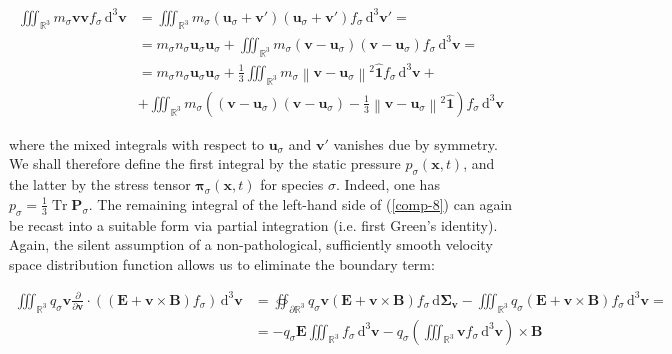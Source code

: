 \begin{align*}
    \iiint_{\mathbb{R}^3}m_\sigma \mathbf{v}\mathbf{v}f_\sigma\,\mathrm{d}^3 \mathbf{v}&=\iiint_{\mathbb{R}^3}m_\sigma \left(\mathbf{u}_\sigma+\mathbf{v}'\right)\left(\mathbf{u}_\sigma+\mathbf{v}'\right)f_\sigma\,\mathrm{d}^3 \mathbf{v}'=\\
    &=m_\sigma n_\sigma \mathbf{u}_\sigma \mathbf{u}_\sigma+\iiint_{\mathbb{R}^3}m_\sigma \left(\mathbf{v}-\mathbf{u}_\sigma\right)\left(\mathbf{v}-\mathbf{u}_\sigma\right) f_\sigma\,\mathrm{d}^3 \mathbf{v}=\\
    &=m_\sigma n_\sigma \mathbf{u}_\sigma \mathbf{u}_\sigma+\frac{1}{3}\iiint_{\mathbb{R}^3}m_\sigma \left\|\mathbf{v}-\mathbf{u}_\sigma\right\|^2 \mathbf{\hat{1}} f_\sigma\,\mathrm{d}^3 \mathbf{v}+\\
    &+\iiint_{\mathbb{R}^3}m_\sigma \left(\left(\mathbf{v}-\mathbf{u}_\sigma\right)\left(\mathbf{v}-\mathbf{u}_\sigma\right)-\frac{1}{3}\left\|\mathbf{v}-\mathbf{u}_\sigma\right\|^2 \mathbf{\hat{1}}\right)f_\sigma\,\mathrm{d}^3 \mathbf{v}
\end{align*}

where the mixed integrals with respect to $\mathbf{u}_\sigma$ and $\mathbf{v}'$ vanishes due by symmetry. We shall therefore define the first integral by the static pressure $p_\sigma(\mathbf{x},t)$, and the latter by the stress tensor $\boldsymbol{\pi}_\sigma(\mathbf{x},t)$ for species $\sigma$. Indeed, one has $p_\sigma = \frac{1}{3}\operatorname{Tr}{\mathbf{P}_\sigma}$. The remaining integral of the left-hand side of (\ref{comp-8}) can again be recast into a suitable form via partial integration (i.e. first Green's identity). Again, the silent assumption of a non-pathological, sufficiently smooth velocity space distribution function allows us to eliminate the boundary term:

\begin{align*}
    \iiint_{\mathbb{R}^3}q_\sigma\mathbf{v}\frac{\partial}{\partial \mathbf{v}}\cdot \left(\left(\mathbf{E}+\mathbf{v}\times \mathbf{B}\right) f_\sigma\right)\,\mathrm{d}^3 \mathbf{v}&=\oiint_{\partial\mathbb{R}^3}q_\sigma \mathbf{v}\left(\mathbf{E}+\mathbf{v}\times \mathbf{B}\right)f_\sigma\,\mathrm{d}\boldsymbol{\Sigma}_{\mathbf{v}}-\iiint_{\mathbb{R}^3}q_\sigma \left(\mathbf{E}+\mathbf{v}\times \mathbf{B}\right)f_\sigma\,\mathrm{d}^3 \mathbf{v}=\\
    &=-q_\sigma \mathbf{E}\iiint_{\mathbb{R}^3}f_\sigma\,\mathrm{d}^3 \mathbf{v} -q_\sigma \left(\iiint_{\mathbb{R}^3}\mathbf{v}f_\sigma\,\mathrm{d}^3 \mathbf{v}\right)\times \mathbf{B}
\end{align*}

